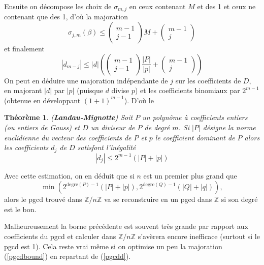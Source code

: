\documentclass[a4paper,11pt]{article}
\newtheorem{thm}{Théorème}
\begin{document}
\begin{giacjshere}
Ensuite on décompose les choix de $\sigma_{m, j}$ en ceux contenant $M$ et
des 1 et ceux ne contenant que des 1, d'où la majoration
\[ \sigma_{j, m} ( \beta ) \leqslant \left(\begin{array}{c}
     m - 1\\
     j - 1
   \end{array}\right) M + \left(\begin{array}{c}
     m - 1\\
     j
   \end{array}\right)  \]
et finalement
\begin{equation}
  | d_{m - j} | \leqslant | d | \left( \left(\begin{array}{c}
    m - 1\\
    j - 1
  \end{array}\right)  \frac{| P |}{| p |} + \left(\begin{array}{c}
    m - 1\\
    j
  \end{array}\right) \right) \label{pgcdd}
\end{equation}
On peut en déduire une majoration indépendante de $j$ sur les coefficients de
$D$, en majorant $| d |$ par $| p |$ (puisque $d$ divise $p$) et les
coefficients binomiaux par $2^{m - 1}$ (obtenue en développant $( 1 + 1 )^{m -
1}$). D'où le

\begin{thm} 
  ({\bf Landau-Mignotte}) 
Soit $P$ un polynôme à coefficients entiers (ou entiers de
  Gauss) et $D$ un diviseur de $P$ de degré $m$. Si $| P |$ désigne la norme
  euclidienne du vecteur des coefficients de $P$ et $p$ le coefficient
  dominant de $P$ alors les coefficients $d_j$ de $D$ satisfont l'inégalité
  \begin{equation}
    | d_j | \leqslant 2^{m - 1} ( | P | + | p | )
  \end{equation}
\end{thm}

Avec cette estimation, on en déduit que si $n$ est un premier plus grand que
\begin{equation}
  \text{$\min \left( 2^{\mbox{degre} ( P ) - 1} ( | P | + | p | ),
  2^{\mbox{degre} ( Q ) - 1} ( | Q | + | q | ) \right)$}, \label{pgcdbound}
\end{equation}
alors le pgcd trouvé dans $\mathbb{Z} / n \mathbb{Z}$ va se reconstruire en un
pgcd dans $\mathbb{Z}$ si son degré est le bon.

Malheureusement la borne précédente est souvent très grande par rapport aux
coefficients du pgcd et calculer dans $\mathbb{Z} / n \mathbb{Z}$ s'avèrera
encore inefficace (surtout si le pgcd est 1). Cela reste vrai même si on
optimise un peu la majoration (\ref{pgcdbound}) en repartant de (\ref{pgcdd}).


\end{giacjshere}
\end{document}
